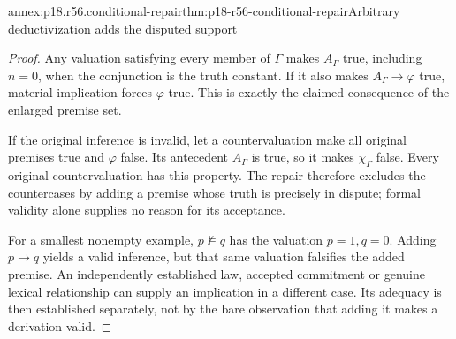 \begin{annexitem}{annex:p18.r56.conditional-repair}{thm:p18-r56-conditional-repair}{Arbitrary deductivization adds the disputed support}
\begin{proof}
Any valuation satisfying every member of \(\Gamma\) makes
\(A_\Gamma\) true, including \(n=0\), when the conjunction
is the truth constant. If it also makes \(A_\Gamma\to\varphi\)
true, material implication forces \(\varphi\) true. This is
exactly the claimed consequence of the enlarged premise set.

If the original inference is invalid, let a countervaluation make
all original premises true and \(\varphi\) false. Its antecedent
\(A_\Gamma\) is true, so it makes \(\chi_\Gamma\) false.
Every original countervaluation has this property. The repair
therefore excludes the countercases by adding a premise whose truth
is precisely in dispute; formal validity alone supplies no reason
for its acceptance.

For a smallest nonempty example, \(p\not\models q\) has the
valuation \(p=1,q=0\). Adding \(p\to q\) yields a valid
inference, but that same valuation falsifies the added premise.
An independently established law, accepted commitment or genuine
lexical relationship can supply an implication in a different case.
Its adequacy is then established separately, not by the bare
observation that adding it makes a derivation valid.
\end{proof}
\end{annexitem}
